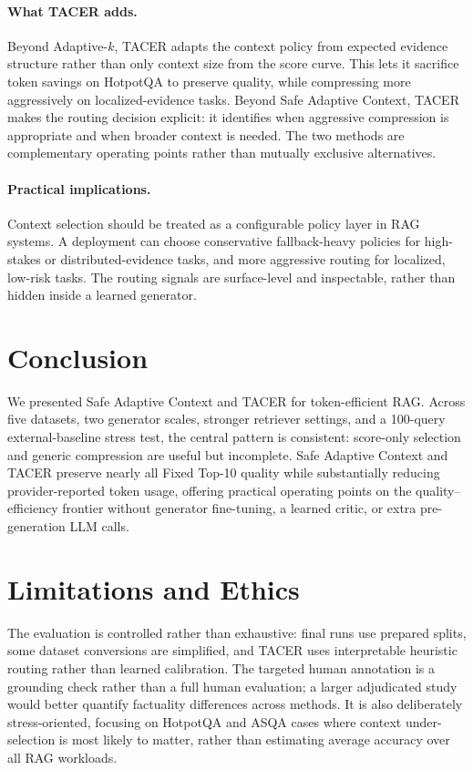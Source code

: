 \documentclass[11pt]{article}
\begin{document}
\paragraph{What TACER adds.}
Beyond Adaptive-$k$, TACER adapts the context policy from expected evidence structure rather than only context size from the score curve. This lets it sacrifice token savings on HotpotQA to preserve quality, while compressing more aggressively on localized-evidence tasks. Beyond Safe Adaptive Context, TACER makes the routing decision explicit: it identifies when aggressive compression is appropriate and when broader context is needed. The two methods are complementary operating points rather than mutually exclusive alternatives.

\paragraph{Practical implications.}
Context selection should be treated as a configurable policy layer in RAG systems. A deployment can choose conservative fallback-heavy policies for high-stakes or distributed-evidence tasks, and more aggressive routing for localized, low-risk tasks. The routing signals are surface-level and inspectable, rather than hidden inside a learned generator.

\section{Conclusion}

We presented Safe Adaptive Context and TACER for token-efficient RAG. Across five datasets, two generator scales, stronger retriever settings, and a 100-query external-baseline stress test, the central pattern is consistent: score-only selection and generic compression are useful but incomplete. Safe Adaptive Context and TACER preserve nearly all Fixed Top-10 quality while substantially reducing provider-reported token usage, offering practical operating points on the quality--efficiency frontier without generator fine-tuning, a learned critic, or extra pre-generation LLM calls.

\section*{Limitations and Ethics}

The evaluation is controlled rather than exhaustive: final runs use prepared splits, some dataset conversions are simplified, and TACER uses interpretable heuristic routing rather than learned calibration. The targeted human annotation is a grounding check rather than a full human evaluation; a larger adjudicated study would better quantify factuality differences across methods. It is also deliberately stress-oriented, focusing on HotpotQA and ASQA cases where context under-selection is most likely to matter, rather than estimating average accuracy over all RAG workloads.
\end{document}
